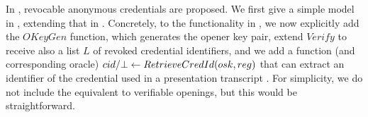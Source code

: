 In \cite{cks10,ckl+15}, revocable anonymous credentials are proposed. We first
give a simple model in , extending that in
. Concretely, to the functionality in
, we now explicitly add the $OKeyGen$ function,
which generates the opener key pair, extend $Verify$ to receive also a list $L$
of revoked credential identifiers, and we add a function (and corresponding
oracle) $cid/\bot \gets RetrieveCredId(osk,reg)$ that can extract an
identifier of the credential used in a presentation transcript \utrans. For
simplicity, we do not include the equivalent to verifiable openings, but this
would be straightforward.

\begin{figure}[ht!]
  \centering
\end{figure}
